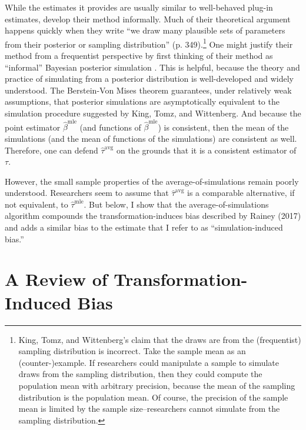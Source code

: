 \documentclass[12pt]{article}
\begin{document}
While the estimates it provides are usually similar to well-behaved plug-in estimates, \cite{KingTomzWittenberg2000} develop their method informally. 
Much of their theoretical argument happens quickly when they write ``we draw many plausible sets of parameters from their posterior or sampling distribution'' (p. 349).\footnote{King, Tomz, and Wittenberg's claim that the draws are from the (frequentist) sampling distribution is incorrect. Take the sample mean as an (counter-)example. If researchers could manipulate a sample to simulate draws from the sampling distribution, then they could compute the population mean with arbitrary precision, because the mean of the sampling distribution is the population mean. Of course, the precision of the sample mean is limited by the sample size--researchers cannot simulate from the sampling distribution.}
One might justify their method from a frequentist perspective by first thinking of their method as ``informal'' Bayesian posterior simulation \citep{GelmanHill2006}.  
This is helpful, because the theory and practice of simulating from a posterior distribution is well-developed and widely understood. 
The Berstein-Von Mises theorem \citep[pp.\@ 140-146]{vanderVaart2000} guarantees, under relatively weak assumptions, that posterior simulations are asymptotically equivalent to the simulation procedure suggested by King, Tomz, and Wittenberg. And because the point estimator $\hat{\beta}^{\text{mle}}$ (and functions of $\hat{\beta}^{\text{mle}}$) is consistent, then the mean of the simulations (and the mean of functions of the simulations) are consistent as well. Therefore, one can defend $\hat{\tau}^{\text{avg}}$ on the grounds that it is a consistent estimator of $\tau$. 

However, the small sample properties of the average-of-simulations remain poorly understood. Researchers seem to assume that $\hat{\tau}^{\text{avg}}$ is a comparable alternative, if not equivalent, to  $\hat{\tau}^{\text{mle}}$. 
But below, I show that the average-of-simulations algorithm compounds the transformation-induces bias described by Rainey (2017) and adds a similar bias to the estimate that I refer to as ``simulation-induced bias.'' 

\section*{A Review of Transformation-Induced Bias}
\end{document}
